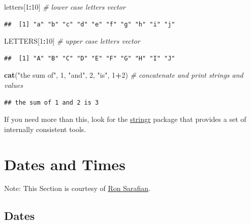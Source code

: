 \documentclass[]{book}
\newenvironment{Shaded}{\begin{snugshade}}{\end{snugshade}}
\newcommand{\KeywordTok}[1]{\textcolor[rgb]{0.13,0.29,0.53}{\textbf{#1}}}
\newcommand{\DecValTok}[1]{\textcolor[rgb]{0.00,0.00,0.81}{#1}}
\newcommand{\StringTok}[1]{\textcolor[rgb]{0.31,0.60,0.02}{#1}}
\newcommand{\CommentTok}[1]{\textcolor[rgb]{0.56,0.35,0.01}{\textit{#1}}}
\newcommand{\OperatorTok}[1]{\textcolor[rgb]{0.81,0.36,0.00}{\textbf{#1}}}
\newcommand{\NormalTok}[1]{#1}
\theoremstyle{definition}
\theoremstyle{definition}
\theoremstyle{definition}
\theoremstyle{remark}
\begin{document}
\begin{Shaded}
\begin{Highlighting}[]
\NormalTok{letters[}\DecValTok{1}\OperatorTok{:}\DecValTok{10}\NormalTok{] }\CommentTok{# lower case letters vector}
\end{Highlighting}
\end{Shaded}

\begin{verbatim}
##  [1] "a" "b" "c" "d" "e" "f" "g" "h" "i" "j"
\end{verbatim}

\begin{Shaded}
\begin{Highlighting}[]
\NormalTok{LETTERS[}\DecValTok{1}\OperatorTok{:}\DecValTok{10}\NormalTok{] }\CommentTok{# upper case letters vector}
\end{Highlighting}
\end{Shaded}

\begin{verbatim}
##  [1] "A" "B" "C" "D" "E" "F" "G" "H" "I" "J"
\end{verbatim}

\begin{Shaded}
\begin{Highlighting}[]
\KeywordTok{cat}\NormalTok{(}\StringTok{"the sum of"}\NormalTok{, }\DecValTok{1}\NormalTok{, }\StringTok{"and"}\NormalTok{, }\DecValTok{2}\NormalTok{, }\StringTok{"is"}\NormalTok{, }\DecValTok{1}\OperatorTok{+}\DecValTok{2}\NormalTok{) }\CommentTok{#  concatenate and print strings and values}
\end{Highlighting}
\end{Shaded}

\begin{verbatim}
## the sum of 1 and 2 is 3
\end{verbatim}

If you need more than this, look for the
\href{https://r4ds.had.co.nz/strings.html}{stringr} package that
provides a set of internally consistent tools.

\section{Dates and Times}\label{dates-and-times}

Note: This Section is courtesy of
\href{https://www.linkedin.com/in/ron-sarafian-4a5a95110/}{Ron
Sarafian}.

\subsection{Dates}\label{dates}
\end{document}
